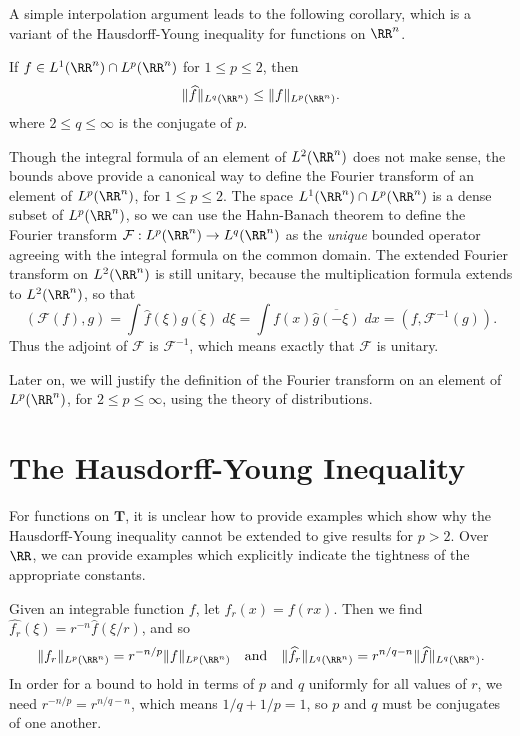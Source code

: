 A simple interpolation argument leads to the following corollary, which is a variant of the Hausdorff-Young inequality for functions on $\RR^n$.

\begin{corollary} If $f \in L^1(\RR^n) \cap L^p(\RR^n)$ for $1 \leq p \leq 2$, then
	\[ \| \widehat{f} \|_{L^q(\RR^n)} \leq \| f \|_{L^p(\RR^n)}. \]
	where $2 \leq q \leq \infty$ is the conjugate of $p$.
\end{corollary}

Though the integral formula of an element of $L^2(\RR^n)$ does not make sense, the bounds above provide a canonical way to define the Fourier transform of an element of $L^p(\RR^n)$, for $1 \leq p \leq 2$. The space $L^1(\RR^n) \cap L^p(\RR^n)$ is a dense subset of $L^p(\RR^n)$, so we can use the Hahn-Banach theorem to define the Fourier transform $\mathcal{F}: L^p(\RR^n) \to L^q(\RR^n)$ as the {\it unique} bounded operator agreeing with the integral formula on the common domain. The extended Fourier transform on $L^2(\RR^n)$ is still unitary, because the multiplication formula extends to $L^2(\RR^n)$, so that
%
\[ (\mathcal{F}(f),g) = \int \widehat{f}(\xi) \overline{g(\xi)}\; d\xi = \int f(x) \overline{\widehat{g}(-\xi)}\; dx = (f,\mathcal{F}^{-1}(g)). \]
%
Thus the adjoint of $\mathcal{F}$ is $\mathcal{F}^{-1}$, which means exactly that $\mathcal{F}$ is unitary.

\begin{remark}
	Later on, we will justify the definition of the Fourier transform on an element of $L^p(\RR^n)$, for $2 \leq p \leq \infty$, using the theory of distributions.
\end{remark}


\section{The Hausdorff-Young Inequality}

For functions on $\mathbf{T}$, it is unclear how to provide examples which show why the Hausdorff-Young inequality cannot be extended to give results for $p > 2$. Over $\RR$, we can provide examples which explicitly indicate the tightness of the appropriate constants.

\begin{example}
	Given an integrable function $f$, let $f_r(x) = f(rx)$. Then we find $\widehat{f_r}(\xi) = r^{-n} \widehat{f}(\xi/r)$, and so
	\[ \| f_r \|_{L^p(\RR^n)} = r^{-n/p} \| f \|_{L^p(\RR^n)} \quad \text{and} \quad \| \widehat{f_r} \|_{L^q(\RR^n)} = r^{n/q-n} \| \widehat{f} \|_{L^q(\RR^n)}. \]
	In order for a bound to hold in terms of $p$ and $q$ uniformly for all values of $r$, we need $r^{-n/p} = r^{n/q-n}$, which means $1/q + 1/p = 1$, so $p$ and $q$ must be conjugates of one another.
\end{example}

